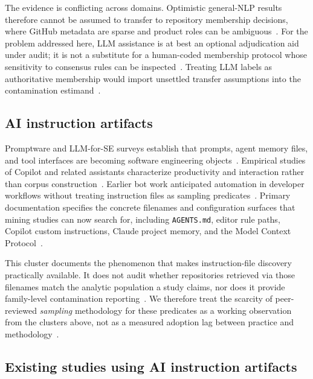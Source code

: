 The evidence is conflicting across domains.
Optimistic general-NLP results therefore cannot be assumed to transfer to repository membership decisions, where GitHub metadata are sparse and product roles can be ambiguous~\cite{ahmed2025llms,kalliamvakou2015indepth,borges2016popularity}.
For the problem addressed here, LLM assistance is at best an optional adjudication aid under audit; it is not a substitute for a human-coded membership protocol whose sensitivity to consensus rules can be inspected~\cite{ahmed2025llms,runeson2009}.
Treating LLM labels as authoritative membership would import unsettled transfer assumptions into the contamination estimand~\cite{ahmed2025llms,gilardi2023chatgpt}.

\subsection{AI instruction artifacts}
\label{subsec:rw-instruction-artifacts}

Promptware and LLM-for-SE surveys establish that prompts, agent memory files, and tool interfaces are becoming software engineering objects~\cite{chen2025promptware,hou2024llm4se,fan2023}.
Empirical studies of Copilot and related assistants characterize productivity and interaction rather than corpus construction~\cite{ziegler2024copilot,barke2023groundedcopilot,vaithilingam2022expectation}.
Earlier bot work anticipated automation in developer workflows without treating instruction files as sampling predicates~\cite{storey2020}.
Primary documentation specifies the concrete filenames and configuration surfaces that mining studies can now search for, including \texttt{AGENTS.md}, editor rule paths, Copilot custom instructions, Claude project memory, and the Model Context Protocol~\cite{agentsmd2025,cursor2024docs,brown2024copilot,claude2024docs,anthropic2024mcp}.

This cluster documents the phenomenon that makes instruction-file discovery practically available.
It does not audit whether repositories retrieved via those filenames match the analytic population a study claims, nor does it provide family-level contamination reporting~\cite{chen2025promptware,baltes2022sampling}.
We therefore treat the scarcity of peer-reviewed \emph{sampling} methodology for these predicates as a working observation from the clusters above, not as a measured adoption lag between practice and methodology~\cite{hou2024llm4se,chen2025promptware}.

\subsection{Existing studies using AI instruction artifacts}
\label{subsec:rw-existing-instruction-studies}

